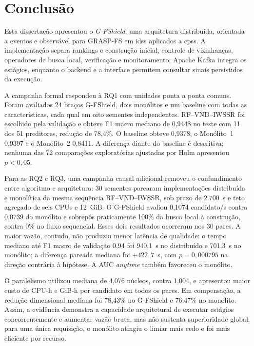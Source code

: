 \chapter{Conclusão}
\label{chapter:conclusao}

Esta dissertação apresentou o \textit{G-FShield}, uma arquitetura distribuída, orientada a eventos e observável para GRASP-FS em \acp{ids} aplicados a \acp{cps}. A implementação separa rankings e construção inicial, controle de vizinhanças, operadores de busca local, verificação e monitoramento; Apache Kafka integra os estágios, enquanto o backend e a interface permitem consultar sinais persistidos da execução.

A campanha formal respondeu à RQ1 com unidades ponta a ponta comuns. Foram avaliados 24 braços G-FShield, dois monólitos e um baseline com todas as características, cada qual em oito sementes independentes. RF--VND--IWSSR foi escolhido pela validação e obteve F1 macro mediano de 0,9448 no teste com 11 dos 51 preditores, redução de 78,4\%. O baseline obteve 0,9378, o Monólito~1 0,9397 e o Monólito~2 0,8411. A diferença diante do baseline é descritiva; nenhuma das 72 comparações exploratórias ajustadas por Holm apresentou $p<0{,}05$.

Para as RQ2 e RQ3, uma campanha causal adicional removeu o confundimento entre algoritmo e arquitetura: 30 sementes parearam implementações distribuída e monolítica da mesma sequência RF--VND--IWSSR, sob prazo de 2.700~s e teto agregado de seis CPUs e 12~GiB. O G-FShield avaliou 0,1074 candidato/s contra 0,0739 do monólito e sobrepôs praticamente 100\% da busca local à construção, contra 0\% no fluxo sequencial. Esses dois resultados ocorreram nos 30 pares. A maior vazão, contudo, não produziu menor latência de qualidade: o tempo mediano até F1 macro de validação 0,94 foi 940,1~s no distribuído e 701,3~s no monólito; a diferença pareada mediana foi $+422{,}7$~s, com $p=0{,}000795$ na direção contrária à hipótese. A AUC \textit{anytime} também favoreceu o monólito.

O paralelismo utilizou mediana de 4,076 núcleos, contra 1,004, e apresentou maior custo de CPU-h e GiB-h por candidato em todos os pares. Em compensação, a redução dimensional mediana foi 78,43\% no G-FShield e 76,47\% no monólito. Assim, a evidência demonstra a capacidade arquitetural de executar estágios concorrentemente e aumentar vazão bruta, mas não sustenta superioridade global: para uma única requisição, o monólito atingiu o limiar mais cedo e foi mais eficiente por recurso.

